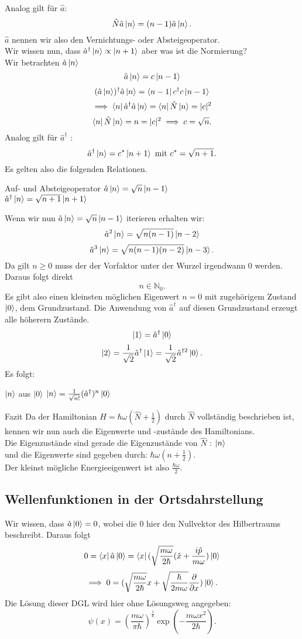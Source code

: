 \documentclass{report}
\begin{document}
Analog gilt für $ \hat{a}$: \[
	\hat{N}\hat{a} \ket{n} = (n-1) \hat{a}\ket{n} 
.\] $\hat{a}$ nennen wir also den Vernichtungs- oder Absteigeoperator.\\
Wir wissen nun, dass $\hat{a}^\dagger \ket{n} \propto \ket{n+1} $ aber was ist die Normierung?\\
Wir betrachten $\hat{a}\ket{n} $ \[
\hat{a} \ket{n} = c \ket{n-1} 
\] \[
(\hat{a} \ket{n} )^\dagger \hat{a}\ket{n} = \bra{n-1} c^\dagger c \ket{n-1} 
\] \[
\implies \bra{n} \hat{a}^\dagger \hat{a} \ket{n} = \bra{n} \hat{N} \ket{n}  = |c|^2
\] \[
\bra{n} \hat{N} \ket{n} = n = |c|^2 \implies c = \sqrt{n} 
.\]   Analog gilt für $\hat{a}^\dagger$ : \[
\hat{a}^\dagger \ket{n} = c^* \ket{n+1} \text{ mit } c^* = \sqrt{n+1} 
.\] Es gelten also die folgenden Relationen.
\begin{redbox}{Auf- und Absteigeoperator}
	$\hat{a} \ket{n} = \sqrt{n} \ket{n-1} $ \\
	$\hat{a}^\dagger \ket{n} = \sqrt{n+1} \ket{n+1} $
\end{redbox}
Wenn wir nun $\hat{a}\ket{n} = \sqrt{n} \ket{n-1} $ iterieren erhalten wir: \[
	\hat{a}^2 \ket{n} = \sqrt{n(n-1)} \ket{n-2} 
\] \[
\hat{a}^3 \ket{n} = \sqrt{n(n-1)(n-2)} \ket{n-3} 
.\]  Da gilt $n \ge 0$ muss der der Vorfaktor unter der Wurzel irgendwann $0$ werden. Daraus folgt direkt \[
n \in \mathbb{N}_0
.\] Es gibt also einen kleinsten möglichen Eigenwert $n = 0$ mit zugehörigem Zustand $\ket{0} $, dem Grundzustand. Die Anwendung von $\hat{a}^\dagger$ auf diesen Grundzustand erzeugt alle höherern Zustände. \[
\ket{1} = \hat{a}^\dagger \ket{0} 
\] \[
\ket{2} = \frac{1}{\sqrt{2} } \hat{a}^\dagger \ket{1}  = \frac{1}{\sqrt{2} } \hat{a}^{\dagger2} \ket{0} 
.\] Es folgt:
\begin{redbox}{$\ket{n} $ aus $\ket{0} $}
	$\ket{n} = \frac{1}{\sqrt{n!} } (\hat{a}^\dagger)^n \ket{0} $
\end{redbox}
\begin{redbox}{Fazit}
	Da der Hamiltonian $H = \hbar \omega (\hat{N} + \frac{1}{2})$ durch $\hat{N}$ vollständig beschrieben ist, kennen wir nun auch die Eigenwerte und -zustände des Hamiltonians. \\
	Die Eigenzustände sind gerade die Eigenzustände von $\hat{N}$ : $\ket{n} $ \\
	und die Eigenwerte sind gegeben durch: $\hbar \omega (n +\frac{1}{2})$. \\
	Der kleinst mögliche Energieeigenwert ist also $\frac{\hbar \omega}{2}$.
\end{redbox}
\subsection{Wellenfunktionen in der Ortsdahrstellung}
Wir wissen, dass $\hat{a} \ket{0} = 0$, wobei die $0$ hier den Nullvektor des Hilbertraums beschreibt. Daraus folgt \[
	0 = \bra{x} \hat{a} \ket{0} = \bra{x} (\sqrt{\frac{m\omega}{2 \hbar}} (\hat{x} + \frac{i\hat{p}}{m\omega}) \ket{0}  
\] \[
\implies 0 = (\sqrt{\frac{m\omega}{2 \hbar}} x + \sqrt{\frac{\hbar }{2 m \omega}} \frac{\partial}{\partial x} ) \ket{0} 
.\]  Die Lösung dieser DGL wird hier ohne Lösungsweg angegeben: \[
\psi(x) = (\frac{m \omega}{\pi \hbar })^{\frac{1}{4}} \exp(-\frac{m \omega x^2}{2 \hbar })
.\] 
\end{document}
